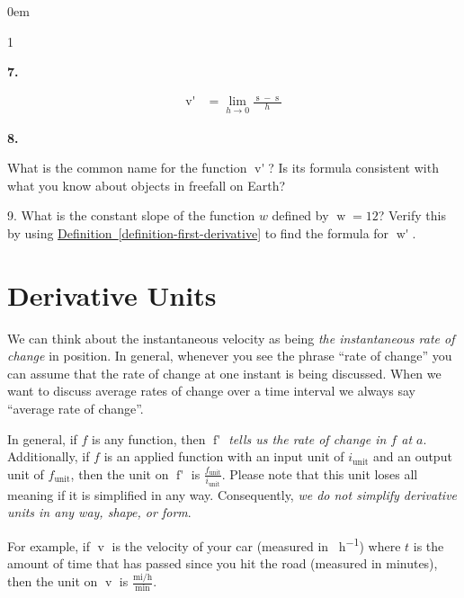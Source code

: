\documentclass[12pt,]{book}
\theoremstyle{plain}
\theoremstyle{definition}
\numberwithin{equation}{section}
\newenvironment{exercisegroup}%
{\medskip\noindent}%
{\par\bigskip}%
\newlength{\exercisegroupindent}%
\newlength{\exercisegroupitemwidth}%
\newenvironment{exercisegrouplist}%
{\vspace{-\partopsep}%
\begin{adjustwidth}{\exercisegroupindent}{0em}}%
{\end{adjustwidth}%
\vspace{-\partopsep}%
\vspace{\baselineskip}}%
\newenvironment{exercisegroupbycol}[1]%
{\begin{exercisegrouplist}%
\vspace{-\multicolsep}%
\begin{multicols}{#1}%
\setlength{\parindent}{0em}%
\setlength{\exercisegroupitemwidth}{\linewidth}}%
{\end{multicols}%
\vspace{-\multicolsep}%
\end{exercisegrouplist}}%
\newenvironment{exercisegroupitem}[1]%
{\begin{minipage}[t]{\exercisegroupitemwidth}
\vspace{0pt}%
{\bfseries#1}%
\rule{0pt}{\baselineskip}}{\strut%
\end{minipage}%
\hspace{\columnsep}}%
\providecommand\phantomsection{}
\newcommand{\fe}[2]{\mathop{{#1}{\left(#2\right)}}}
\newcommand{\fd}[1]{#1'}
\begin{document}
\begin{exercisegroup}
\begin{exercisegroupbycol}{1}
\begin{exercisegroupitem}{7. }
\begin{align}
\fe{\fd{v}}{t}&=\lim_{h\to0}\frac{\fe{s}{t+h}-\fe{s}{t}}{h}\label{instantaneous-acceleration-equation}
\end{align}%
\end{exercisegroupitem}%
\par%
\begin{exercisegroupitem}{8. }\phantomsection\hypertarget{exercise-135}{\null}
What is the common name for the function \(\fe{\fd{v}}{t}\)? Is its formula consistent with what you know about objects in freefall on Earth?%
\end{exercisegroupitem}%
\par%
\end{exercisegroupbycol}%
\end{exercisegroup}%
\begin{exerciselist}
\item[9.]\phantomsection\hypertarget{exercise-136}{\null}What is the constant slope of the function \(w\) defined by \(\fe{w}{x}=12\)? Verify this by using \hyperref[definition-first-derivative]{Definition~\ref*{definition-first-derivative}} to find the formula for \(\fe{\fd{w}}{x}\).%
\par\smallskip
\end{exerciselist}
\typeout{************************************************}
\typeout{************************************************}
\section[Derivative Units]{Derivative Units}\label{section-derivative-units}
We can think about the instantaneous velocity as being \emph{the instantaneous rate of change} in position. In general, whenever you see the phrase ``rate of change'' you can assume that the rate of change at one instant is being discussed. When we want to discuss average rates of change over a time interval we always say ``average rate of change''.%
\par
In general, if \(f\) is any function, then \emph{\(\fe{\fd{f}}{a}\) tells us the rate of change in \(f\) at \(a\)}. Additionally, if \(f\) is an applied function with an input unit of \(i_{\text{unit}}\) and an output unit of \(f_{\text{unit}}\), then the unit on \(\fe{\fd{f}}{a}\) is \(\frac{f_{\text{unit}}}{i_{\text{unit}}}\). Please note that this unit loses all meaning if it is simplified in any way. Consequently, \emph{we do not simplify derivative units in any way, shape, or form}.%
\par
For example, if \(\fe{v}{t}\) is the velocity of your car (measured in \si{\mile\per\hour}) where \(t\) is the amount of time that has passed since you hit the road (measured in minutes), then the unit on \(\fe{v}{t}\) is \(\frac{\text{mi}/\text{h}}{\text{min}}\).%
\typeout{************************************************}
\typeout{************************************************}
\end{document}
